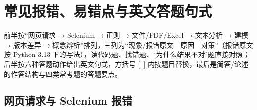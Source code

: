 \chapter{常见报错、易错点与英文答题句式}
\providecommand{\DEbs}{\textbackslash}
\newcommand{\DEsz}{\scriptsize}
\newenvironment{DEerr}{\par\DEsz\setlength{\LTpre}{1pt}\setlength{\LTpost}{2pt}%
  \setlength{\tabcolsep}{2.5pt}\renewcommand{\arraystretch}{1.0}\rowcolors{2}{}{gray!7}%
  \begin{longtable}{@{}>{\raggedright\arraybackslash}p{5.4cm}>{\raggedright\arraybackslash}p{4.9cm}>{\raggedright\arraybackslash}p{\dimexpr\textwidth-10.3cm-10pt\relax}@{}}\toprule
  \bfseries 现象 / 报错信息 & \bfseries 原因 & \bfseries 对策\\\midrule\endhead}%
  {\bottomrule\end{longtable}\par}
\newcommand{\DEe}[2]{\par\noindent\hangindent=1em\hangafter=1{\bfseries\color{chead}#1}\enspace #2\par}
\makeatletter
\newcommand{\DEneed}[1]{\par\begingroup\setlength{\dimen@}{#1}\vskip\z@\@plus\dimen@\penalty-100\vskip\z@\@plus-\dimen@\vskip\dimen@\penalty9999\vskip-\dimen@\vskip\z@skip\endgroup}
\makeatother
\newenvironment{DEeng}{\par\DEsz\setlength{\parskip}{0.6pt}\setlength{\columnsep}{10pt}\begin{multicols}{2}}{\end{multicols}\par}

{\footnotesize\noindent{}\quad 前半按“网页请求 → Selenium → 正则 → 文件/PDF/Excel → 文本分析 → 建模 → 版本差异 → 概念辨析”排列，三列为“现象/报错原文—原因—对策”（报错原文按 Python 3.13 下的写法），读代码题、找错题、“为什么结果不对”题直接对照；后半按六种答题动作给出英文句式，方括号 [~] 内按题目替换，最后是简答/论述的作答结构与四类常考题的答题要点。\par}

\section{网页请求与 Selenium 报错}

